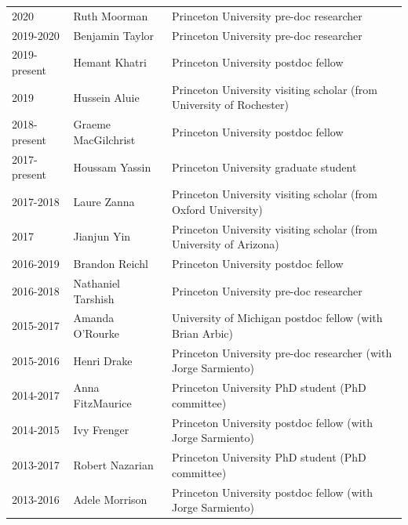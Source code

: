 \documentclass{article}
\begin{document}
\begin{tabular}{lll}

2020 & Ruth Moorman & Princeton University pre-doc researcher \\ 

2019-2020 & Benjamin Taylor & Princeton University pre-doc researcher \\ 

2019-present & Hemant Khatri & Princeton University postdoc fellow  \\ 

2019     & Hussein Aluie & Princeton University visiting scholar (from University of Rochester)  \\ 

2018-present & Graeme MacGilchrist & Princeton University postdoc fellow \\ 

2017-present & Houssam Yassin & Princeton University graduate student \\ 

2017-2018 & Laure Zanna  & Princeton University visiting scholar (from Oxford University)  \\

2017 & Jianjun Yin       & Princeton University visiting scholar (from University of Arizona)  \\

2016-2019 & Brandon Reichl       & Princeton University postdoc fellow  \\

2016-2018 & Nathaniel Tarshish & Princeton University pre-doc researcher \\

2015-2017 & Amanda O'Rourke  & University of Michigan postdoc fellow (with Brian Arbic) \\

2015-2016    & Henri Drake             & Princeton University pre-doc researcher (with Jorge Sarmiento) \\

2014-2017 & Anna FitzMaurice   & Princeton University PhD student (PhD committee) \\ 

2014-2015     & Ivy Frenger            & Princeton University postdoc fellow (with Jorge Sarmiento) \\

2013-2017 & Robert Nazarian    & Princeton University PhD student (PhD committee) \\ 

2013-2016     & Adele Morrison     & Princeton University postdoc fellow (with Jorge Sarmiento) \\


\end{tabular}
\end{document}
